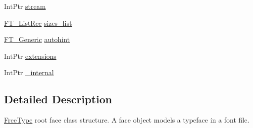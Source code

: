 \begin{DoxyCompactItemize}
\item 
IntPtr \hyperlink{struct_tao_1_1_free_type_1_1_f_t___face_rec_aac30e7915d9f04e1b04e0723aa66c2b0}{stream}
\item 
\hyperlink{struct_tao_1_1_free_type_1_1_f_t___list_rec}{FT\_\-ListRec} \hyperlink{struct_tao_1_1_free_type_1_1_f_t___face_rec_ae536751c83a5757d40996cdb1ec1aefe}{sizes\_\-list}
\item 
\hyperlink{struct_tao_1_1_free_type_1_1_f_t___generic}{FT\_\-Generic} \hyperlink{struct_tao_1_1_free_type_1_1_f_t___face_rec_aa00903cea2af7dd47eff64fbb84707e9}{autohint}
\item 
IntPtr \hyperlink{struct_tao_1_1_free_type_1_1_f_t___face_rec_a81fd413695e37284ba213b452fd12678}{extensions}
\item 
IntPtr \hyperlink{struct_tao_1_1_free_type_1_1_f_t___face_rec_a05377c0453ea2bb828762633fa708745}{\_\-internal}
\end{DoxyCompactItemize}


\subsection{Detailed Description}
\hyperlink{namespace_tao_1_1_free_type}{FreeType} root face class structure. A face object models a typeface in a font file. 

